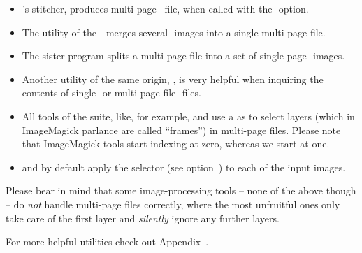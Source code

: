\begin{itemize}
\item
  's stitcher,  produces
  multi-page ~file, when called with the -option.

\item
  The utility  of the
  -
  merges several -images into a single multi-page
  file.

\item
  The sister program  splits a multi-page file
  into a set of single-page -images.

\item
  Another utility of the same origin, , is very
  helpful when inquiring the contents of single- or multi-page
  file -files.

\item
  All tools of the  suite, like,
  for example,  and  use a
   as
  \App{} to select layers (which in ImageMagick parlance are called
  ``frames'') in multi-page files.  Please
  note that ImageMagick tools start indexing at zero, whereas we start
  at one.

\item
  \App{} and \OtherApp{} by default apply the
   selector (see
  option~)
  to each of the input images.
\end{itemize}

Please bear in mind that some image-processing tools -- none of the
above though -- do \emph{not} handle multi-page files correctly, where
the most unfruitful ones only take care of the first layer and
\emph{silently} ignore any further layers.

For more helpful utilities check out
Appendix~.

